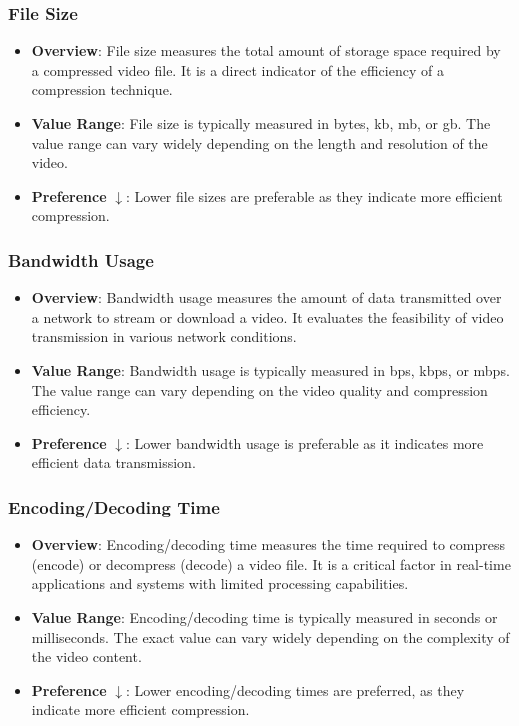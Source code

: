 \documentclass{ioereport}
\begin{document}
        \subsubsection{File Size}
            \begin{itemize}
                \item \textbf{Overview}: File size measures the total amount of storage space required by a compressed video file. It is a direct indicator of the efficiency of a compression technique.
                \item \textbf{Value Range}: File size is typically measured in bytes, \gls{kb}, \gls{mb}, or \gls{gb}. The value range can vary widely depending on the length and resolution of the video.
                \item \textbf{Preference} $\downarrow$: Lower file sizes are preferable as they indicate more efficient compression.
            \end{itemize}

        \subsubsection{Bandwidth Usage}
            \begin{itemize}
                \item \textbf{Overview}: Bandwidth usage measures the amount of data transmitted over a network to stream or download a video. It evaluates the feasibility of video transmission in various network conditions.
                \item \textbf{Value Range}:  Bandwidth usage is typically measured in \gls{bps}, \gls{kbps}, or \gls{mbps}. The value range can vary depending on the video quality and compression efficiency.
                \item \textbf{Preference} $\downarrow$: Lower bandwidth usage is preferable as it indicates more efficient data transmission.
            \end{itemize}

        \subsubsection{Encoding/Decoding Time}
        \begin{itemize}
            \item \textbf{Overview}: Encoding/decoding time measures the time required to compress (encode) or decompress (decode) a video file. It is a critical factor in real-time applications and systems with limited processing capabilities.
            \item \textbf{Value Range}: Encoding/decoding time is typically measured in seconds or milliseconds. The exact value can vary widely depending on the complexity of the video content.
            \item \textbf{Preference} $\downarrow$: Lower encoding/decoding times are preferred, as they indicate more efficient compression.
        \end{itemize}
\end{document}

